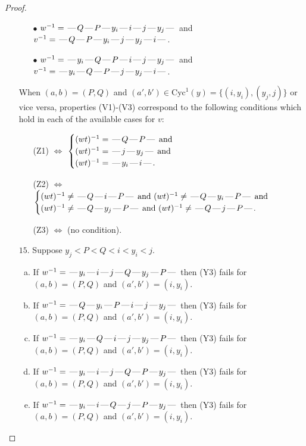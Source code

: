 \documentclass[10pt]{article}
\theoremstyle{definition}
\theoremstyle{definition}
\def\dash{\text{\hspace{0.5mm}---\hspace{0.5mm}}}
\def\Cyc{\mathrm{Cyc}}
\begin{document}
\begin{proof}
\begin{enumerate}
\begin{enumerate}
\item[$\bullet$] $w^{-1} = \dash Q\dash P\dash y_i\dash i\dash j\dash y_j\dash $ and $v^{-1} = \dash Q\dash P\dash y_i\dash j\dash y_j\dash i\dash $.
\item[$\bullet$] $w^{-1} = \dash y_i\dash Q\dash P\dash i\dash j\dash y_j\dash $ and $v^{-1} = \dash y_i\dash Q\dash P\dash j\dash y_j\dash i\dash $.
\end{enumerate}
When $(a,b)= (P,Q)$ and $(a',b')\in \Cyc^1(y)=\{(i,y_i),(y_j,j)\}$ or vice versa,
properties (V1)-(V3) correspond to the following conditions which hold in
each of the available cases for $v$:
\begin{enumerate}
\item[](Z1) $\Leftrightarrow$ $\begin{cases}\text{$(wt)^{-1} = \dash Q \dash P \dash$}\text{ and }\\
\text{$(wt)^{-1} = \dash j \dash y_j \dash$}\text{ and }\\
\text{$(wt)^{-1} = \dash y_i \dash i \dash$}.\end{cases}$
\item[](Z2) $\Leftrightarrow$ $\begin{cases}\text{$(wt)^{-1} \neq \dash Q \dash i \dash P \dash$ and $(wt)^{-1}\neq \dash Q \dash y_i \dash P \dash$}\text{ and }\\
\text{$(wt)^{-1} \neq \dash Q \dash y_j \dash P \dash$ and $(wt)^{-1}\neq \dash Q \dash j \dash P \dash$}.\end{cases}$
\item[](Z3) $\Leftrightarrow$ (no condition).
\end{enumerate}
\item[$15$.] Suppose $y_j < P < Q < i < y_i < j$.
\begin{enumerate}[(a)]
\item If $w^{-1} = \dash y_i\dash i\dash j\dash Q\dash y_j\dash P\dash $ then (Y3) fails for $(a,b)=(P,Q)$ and $(a',b')=(i,y_i)$.
\item If $w^{-1} = \dash Q\dash y_i\dash P\dash i\dash j\dash y_j\dash $ then (Y3) fails for $(a,b)=(P,Q)$ and $(a',b')=(i,y_i)$.
\item If $w^{-1} = \dash y_i\dash Q\dash i\dash j\dash y_j\dash P\dash $ then (Y3) fails for $(a,b)=(P,Q)$ and $(a',b')=(i,y_i)$.
\item If $w^{-1} = \dash y_i\dash i\dash j\dash Q\dash P\dash y_j\dash $ then (Y3) fails for $(a,b)=(P,Q)$ and $(a',b')=(i,y_i)$.
\item If $w^{-1} = \dash y_i\dash i\dash Q\dash j\dash P\dash y_j\dash $ then (Y3) fails for $(a,b)=(P,Q)$ and $(a',b')=(i,y_i)$.

\end{enumerate}
\end{enumerate}
\end{proof}
\end{document}
